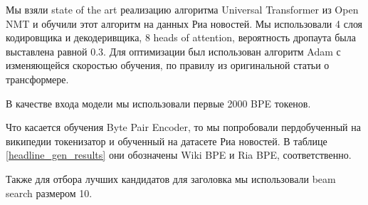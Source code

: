\documentclass[14pt]{matmex-diploma-custom}
\begin{document}
Мы взяли state of the art реализацию алгоритма Universal Transformer из Open NMT \cite{2017opennmt} и обучили этот алгоритм на данных Риа новостей. Мы использовали 4 слоя кодировщика и декодеривщика, 8 heads of attention, вероятность дропаута была выставлена равной 0.3. Для оптимизации был использован алгоритм Adam с изменяющейся скоростью обучения, по правилу из оригинальной статьи о трансформере.

В качестве входа модели мы использовали первые 2000 BPE токенов.

Что касается обучения Byte Pair Encoder, то мы попробовали пердобученный на википедии токенизатор и обученный на датасете Риа новостей. В таблице \ref{headline_gen_results} они обозначены Wiki BPE и Ria BPE, соответственно.

Также для отбора лучших кандидатов для заголовка мы использовали beam search размером 10.
\end{document}
